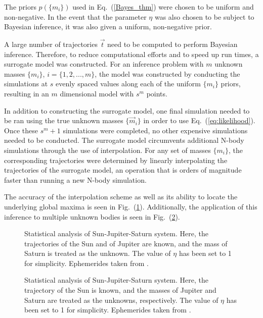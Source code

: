 \documentclass[twocolumn]{aastex63}
\begin{document}
The priors $p(\{m_i\})$ used in Eq.~(\ref{Bayes_thm}) were chosen to be uniform and non-negative. In the event that the parameter $\eta$ was also chosen to be subject to Bayesian inference, it was also given a uniform, non-negative prior. 

A large number of trajectories $\vec{t}$ need to be computed to perform Bayesian inference. Therefore, to reduce computational efforts and to speed up run times, a surrogate model was constructed. For an inference problem with $m$ unknown masses $\{m_i\}$, $i=\{1, 2, ..., m\}$, the model was constructed by conducting the simulations at $s$ evenly spaced values along each of the uniform $\{m_i\}$ priors, resulting in an $m$ dimensional model with $s^m$ points. 

In addition to constructing the surrogate model, one final simulation needed to be ran using the true unknown masses $\{\vec{m}_i\}$ in order to use Eq.~(\ref{eq:likelihood}). Once these $s^m + 1$ simulations were completed, no other expensive simulations needed to be conducted. The surrogate model circumvents additional N-body simulations through the use of interpolation. For any set of masses $\{m_i\}$, the corresponding trajectories were determined by linearly interpolating the trajectories of the surrogate model, an operation that is orders of magnitude faster than running a new N-body simulation.

The accuracy of the interpolation scheme as well as its ability to locate the underlying global maxima is seen in Fig.~(\ref{fig:one_dimensional_stats}). Additionally, the application of this inference to multiple unknown bodies is seen in Fig.~(\ref{fig:two_dimensional_stats}).

\begin{figure}[ht!]
\caption{Statistical analysis of Sun-Jupiter-Saturn system. Here, the trajectories of the Sun and of Jupiter are known, and the mass of Saturn is treated as the unknown. The value of $\eta$ has been set to 1 for simplicity. Ephemerides taken from \cite{HORIZONS}. \label{fig:one_dimensional_stats}}
\end{figure}

\begin{figure}[ht!]
\caption{Statistical analysis of Sun-Jupiter-Saturn system. Here, the trajectory of the Sun is known, and the masses of Jupiter and Saturn are treated as the unknowns, respectively. The value of $\eta$ has been set to 1 for simplicity. Ephemerides taken from \cite{HORIZONS}.  \label{fig:two_dimensional_stats}}
\end{figure}
\end{document}
